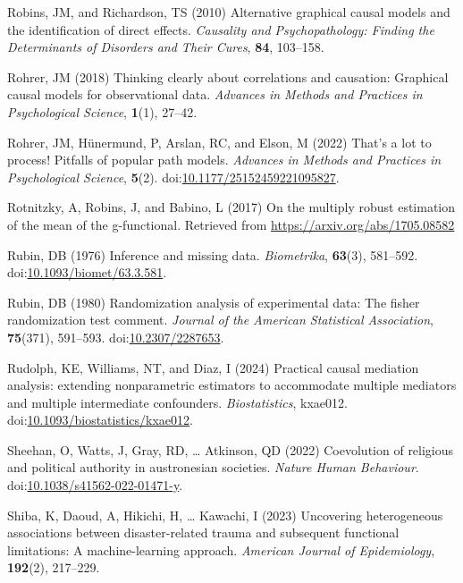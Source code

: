 \documentclass[
  single column]{article}
\newlength{\cslhangindent}
\newenvironment{CSLReferences}[2] %
 {\begin{list}{}{%
  \setlength{\itemindent}{0pt}
  \setlength{\leftmargin}{0pt}
  \setlength{\parsep}{0pt}
  \ifodd #1
   \setlength{\leftmargin}{\cslhangindent}
   \setlength{\itemindent}{-1\cslhangindent}
  \fi
  \setlength{\itemsep}{#2\baselineskip}}}
 {\end{list}}
\begin{document}
\begin{CSLReferences}{1}{0}
Robins, JM, and Richardson, TS (2010) Alternative graphical causal
models and the identification of direct effects. \emph{Causality and
Psychopathology: Finding the Determinants of Disorders and Their Cures},
\textbf{84}, 103--158.

Rohrer, JM (2018) Thinking clearly about correlations and causation:
Graphical causal models for observational data. \emph{Advances in
Methods and Practices in Psychological Science}, \textbf{1}(1), 27--42.

Rohrer, JM, Hünermund, P, Arslan, RC, and Elson, M (2022) That's a lot
to process! Pitfalls of popular path models. \emph{Advances in Methods
and Practices in Psychological Science}, \textbf{5}(2).
doi:\href{https://doi.org/10.1177/25152459221095827}{10.1177/25152459221095827}.

Rotnitzky, A, Robins, J, and Babino, L (2017) On the multiply robust
estimation of the mean of the g-functional. Retrieved from
\url{https://arxiv.org/abs/1705.08582}

Rubin, DB (1976) Inference and missing data. \emph{Biometrika},
\textbf{63}(3), 581--592.
doi:\href{https://doi.org/10.1093/biomet/63.3.581}{10.1093/biomet/63.3.581}.

Rubin, DB (1980) Randomization analysis of experimental data: The fisher
randomization test comment. \emph{Journal of the American Statistical
Association}, \textbf{75}(371), 591--593.
doi:\href{https://doi.org/10.2307/2287653}{10.2307/2287653}.

Rudolph, KE, Williams, NT, and Diaz, I (2024) {Practical causal
mediation analysis: extending nonparametric estimators to accommodate
multiple mediators and multiple intermediate confounders}.
\emph{Biostatistics}, kxae012.
doi:\href{https://doi.org/10.1093/biostatistics/kxae012}{10.1093/biostatistics/kxae012}.

Sheehan, O, Watts, J, Gray, RD, \ldots{} Atkinson, QD (2022) Coevolution
of religious and political authority in austronesian societies.
\emph{Nature Human Behaviour}.
doi:\href{https://doi.org/10.1038/s41562-022-01471-y}{10.1038/s41562-022-01471-y}.

Shiba, K, Daoud, A, Hikichi, H, \ldots{} Kawachi, I (2023) Uncovering
heterogeneous associations between disaster-related trauma and
subsequent functional limitations: A machine-learning approach.
\emph{American Journal of Epidemiology}, \textbf{192}(2), 217--229.


\end{CSLReferences}
\end{document}

